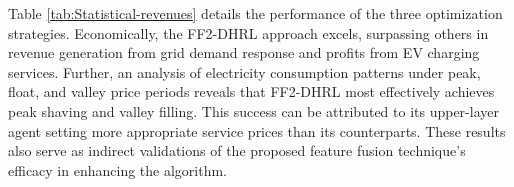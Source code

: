 \documentclass[preprint,12pt]{elsarticle}
\newcommand{\kwh}{kW$\cdot$h}
\begin{document}
Table \ref{tab:Statistical-revenues} details the performance of the three optimization strategies.  Economically, the FF2-DHRL approach excels, surpassing others in revenue generation from grid demand response and profits from EV charging services.  Further, an analysis of electricity consumption patterns under peak, float, and valley price periods reveals that FF2-DHRL most effectively achieves peak shaving and valley filling.  This success can be attributed to its upper-layer agent setting more appropriate service prices than its counterparts.  These results also serve as indirect validations of the proposed feature fusion technique's efficacy in enhancing the algorithm. 
\end{document}
